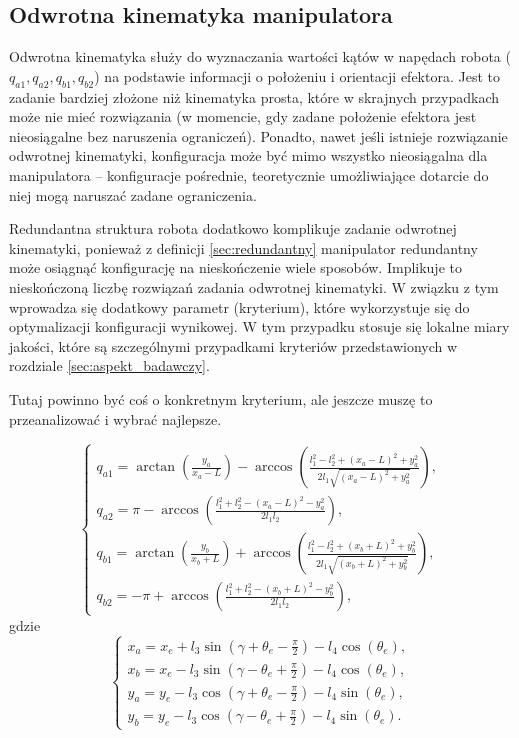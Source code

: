 \documentclass[printmode]{mgr}
\begin{document}
\subsection{Odwrotna kinematyka manipulatora}
Odwrotna kinematyka służy do wyznaczania wartości kątów w napędach robota ($q_{a1}, q_{a2}, q_{b1}, q_{b2}$) na podstawie informacji o 
położeniu i orientacji efektora. Jest to zadanie bardziej złożone niż kinematyka prosta, które w skrajnych przypadkach
może nie mieć rozwiązania (w momencie, gdy zadane położenie efektora jest nieosiągalne bez naruszenia ograniczeń). 
Ponadto, nawet jeśli istnieje rozwiązanie odwrotnej kinematyki, konfiguracja może być mimo wszystko nieosiągalna dla manipulatora
-- konfiguracje pośrednie, teoretycznie umożliwiające dotarcie do niej mogą naruszać zadane ograniczenia.

Redundantna struktura robota dodatkowo komplikuje zadanie odwrotnej kinematyki, ponieważ z definicji \ref{sec:redundantny}
manipulator redundantny może osiągnąć konfigurację na nieskończenie wiele sposobów. Implikuje to nieskończoną
liczbę rozwiązań zadania odwrotnej kinematyki. W związku z tym wprowadza się dodatkowy parametr (kryterium), które
wykorzystuje się do optymalizacji konfiguracji wynikowej. W tym przypadku stosuje się lokalne miary jakości, które są szczególnymi
przypadkami kryteriów przedstawionych w rozdziale \ref{sec:aspekt_badawczy}. 

Tutaj powinno być coś o konkretnym kryterium, ale jeszcze muszę to przeanalizować i wybrać najlepsze.

\begin{equation}
\begin{cases}
q_{a1} = \arctan(\frac{y_a}{x_a-L})-\arccos(\frac{l_1^2-l_2^2+(x_a-L)^2+y_a^2}{2l_1\sqrt{(x_a-L)^2+y_a^2}}),\\
q_{a2} = \pi - \arccos(\frac{l_1^2+l_2^2-(x_a-L)^2-y_a^2}{2l_1l_2}),\\
q_{b1} = \arctan(\frac{y_b}{x_b+L}) + \arccos(\frac{l_1^2-l_2^2+(x_b+L)^2+y_b^2}{2l_1\sqrt{(x_b+L)^2+y_b^2}}),\\
q_{b2} = -\pi + \arccos(\frac{l_1^2+l_2^2-(x_b+L)^2-y_b^2}{2l_1l_2}),
\end{cases}
\label{eq:kinematyka_odwrotna}
\end{equation}
gdzie
\begin{equation}
\begin{cases}
x_a = x_e + l_3\sin(\gamma + \theta_e - \frac{\pi}{2}) - l_4\cos(\theta_e),\\
x_b = x_e - l_3\sin(\gamma - \theta_e + \frac{\pi}{2}) - l_4\cos(\theta_e),\\
y_a = y_e - l_3\cos(\gamma + \theta_e - \frac{\pi}{2}) - l_4\sin(\theta_e),\\
y_b = y_e - l_3\cos(\gamma - \theta_e + \frac{\pi}{2}) - l_4\sin(\theta_e).
\end{cases}
\label{eq:kinematyka_odwrotna2}
\end{equation}
\end{document}
